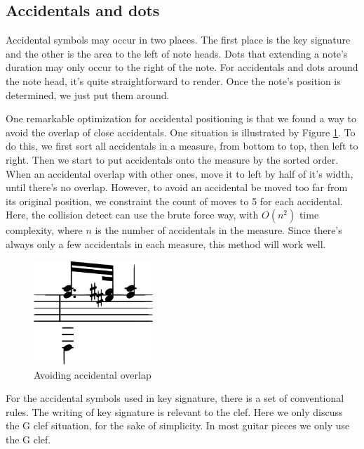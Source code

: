 \subsection{Accidentals and dots}
Accidental symbols may occur in two places. The first place is the key signature and the other is the area to the left of note heads. Dots that extending a note's duration may only occur to the right of the note. For accidentals and dots around the note head, it's quite straightforward to render. Once the note's position is determined, we just put them around. 

One remarkable optimization for accidental positioning is that we found a way to avoid the overlap of close accidentals. One situation is illustrated by Figure \ref{fig:avoid-accidental-overlap}. To do this, we first sort all accidentals in a measure, from bottom to top, then left to right. Then we start to put accidentals onto the measure by the sorted order. When an accidental overlap with other ones, move it to left by half of it's width, until there's no overlap. However, to avoid an accidental be moved too far from its original position, we constraint the count of moves to 5 for each accidental. Here, the collision detect can use the brute force way, with $O(n^2)$ time complexity, where $n$ is the number of accidentals in the measure. Since there's always only a few accidentals in each measure, this method will work well.

\begin{figure}[h]
    \centering
    \includegraphics[width=0.4\textwidth]{Figures/accidental-overlap.eps}
    \caption{Avoiding accidental overlap}
    \label{fig:avoid-accidental-overlap}
\end{figure}
For the accidental symbols used in key signature, there is a set of conventional rules. The writing of key signature is relevant to the clef. Here we only discuss the G clef situation, for the sake of simplicity. In most guitar pieces we only use the G clef.


